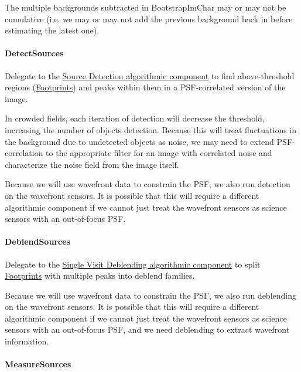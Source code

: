 The multiple backgrounds subtracted in BootstrapImChar may or may not be cumulative (i.e. we may or may not add the previous background back in before estimating the latest one).

\paragraph{DetectSources}
\label{sec:drpBootstrapImChar_DetectSources}

Delegate to the \hyperref[sec:acSourceDetection]{Source Detection algorithmic component} to find above-threshold regions (\hyperref[sec:spFootprints]{Footprints}) and peaks within them in a PSF-correlated version of the image.

In crowded fields, each iteration of detection will decrease the threshold, increasing the number of objects detection.  Because this will treat fluctuations in the background due to undetected objects as noise, we may need to extend PSF-correlation to the appropriate filter for an image with correlated noise and characterize the noise field from the image itself.

Because we will use wavefront data to constrain the PSF, we also run detection on the wavefront sensors.  It is possible that this will require a different algorithmic component if we cannot just treat the wavefront sensors as science sensors with an out-of-focus PSF.

\paragraph{DeblendSources}
\label{sec:drpBootstrapImChar_DeblendSources}

Delegate to the \hyperref[sec:acSingleVisitDeblending]{Single Visit Deblending algorithmic component} to split \hyperref[sec:spFootprints]{Footprints} with multiple peaks into deblend families.

Because we will use wavefront data to constrain the PSF, we also run deblending on the wavefront sensors.  It is possible that this will require a different algorithmic component if we cannot just treat the wavefront sensors as science sensors with an out-of-focus PSF, and we need deblending to extract wavefront information.

\paragraph{MeasureSources}
\label{sec:drpBootstrapImChar_MeasureSources}

